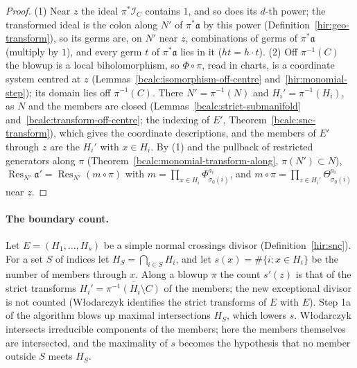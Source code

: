 \begin{proof}
\leanok
(1) Near \(z\) the ideal \(\pi^*\mathcal I_C\) contains \(1\), and so does its \(d\)-th power; the transformed ideal is the colon along \(N'\) of \(\pi^*\mathfrak a\)
by this power (Definition~\ref{hir:geo-transform}), so its germs are, on \(N'\) near \(z\), combinations of germs of \(\pi^*\mathfrak a\) (multiply by \(1\)), and
every germ \(t\) of \(\pi^*\mathfrak a\) lies in it (\(ht=h\cdot t\)). (2) Off \(\pi^{-1}(C)\) the blowup is a local biholomorphism, so \(\Phi\circ\pi\), read in
charts, is a coordinate system centred at \(z\) (Lemmas~\ref{bcalc:isomorphism-off-centre} and~\ref{hir:monomial-step}); its domain lies off \(\pi^{-1}(C)\).
There \(N'=\pi^{-1}(N)\) and \(H_i'=\pi^{-1}(H_i)\), as \(N\) and the members are closed (Lemmas~\ref{bcalc:strict-submanifold}
and~\ref{bcalc:transform-off-centre}; the indexing of \(E'\), Theorem~\ref{bcalc:snc-transform}), which gives the coordinate descriptions, and the members of
\(E'\) through \(z\) are the \(H_i'\) with \(x\in H_i\). By (1) and the pullback of restricted generators along \(\pi\) (Theorem~\ref{bcalc:monomial-transform-along},
\(\pi(N')\subset N\)), \(\operatorname{Res}_{N'}\mathfrak a'=\operatorname{Res}_{N'}(m\circ\pi)\) with \(m=\prod_{x\in H_i}\Phi_{\sigma_0(i)}^{a_i}\), and
\(m\circ\pi=\prod_{z\in H_i'}\Theta_{\sigma_0(i)}^{a_i}\) near \(z\).
\end{proof}

\paragraph{The boundary count.} Let \(E=(H_1,\dots,H_s)\) be a simple normal crossings divisor (Definition~\ref{hir:snc}). For a set \(S\) of
indices let \(H_S=\bigcap_{i\in S}H_i\), and let \(s(x)=\#\{i:x\in H_i\}\) be the number of members through \(x\). Along a blowup \(\pi\) the
count \(s'(z)\) is that of the strict transforms \(H_i'=\overline{\pi^{-1}(H_i\setminus C)}\) of the members; the new exceptional divisor is not
counted (Włodarczyk identifies the strict transforms of \(E\) with \(E\)). Step 1a of the algorithm blows up maximal intersections \(H_S\),
which lowers \(s\). Włodarczyk intersects irreducible components of the members; here the members themselves are intersected, and the
maximality of \(s\) becomes the hypothesis that no member outside \(S\) meets \(H_S\).

